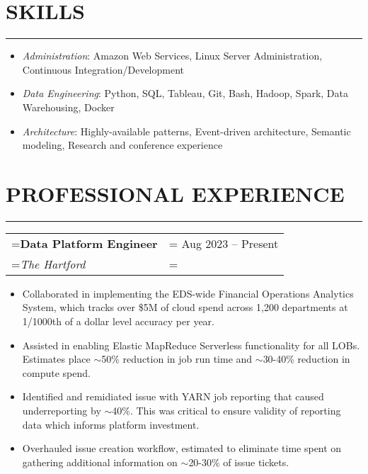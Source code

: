 \documentclass{article}
\begin{document}
\section*{\normalsize{SKILLS}}
\vspace{-1.8em}
\noindent\rule{\textwidth}{.5pt}
\begin{itemize}[label={}, leftmargin=1em]
    \setlength\itemsep{0em}
    \item \textit{Administration}: Amazon Web Services, Linux Server Administration, Continuous Integration/Development
    \item \textit{Data Engineering}: Python, SQL, Tableau, Git, Bash, Hadoop, Spark, Data Warehousing, Docker
    \item \textit{Architecture}: Highly-available patterns, Event-driven architecture, Semantic modeling, Research and conference experience 
\end{itemize}


\section*{\normalsize{PROFESSIONAL EXPERIENCE}}
\vspace{-1.8em}
\noindent\rule{\textwidth}{.5pt}

\vspace{.5em}
\hspace{-1em}
\begin{tabularx}{\textwidth}{
    >{\raggedright\arraybackslash\hsize=1\hsize\linewidth=\hsize}X
    >{\raggedleft\arraybackslash\hsize=1\hsize\linewidth=\hsize}X }
    \textbf{Data Platform Engineer} & Aug 2023 -- Present\\
    \textit{The Hartford} & \\
\end{tabularx}
\vspace{-.5em}
\begin{itemize}[label={--}, leftmargin=1em]
    \setlength\itemsep{0em}
    \item Collaborated in implementing the EDS-wide Financial Operations Analytics System, which tracks over \$5M of cloud spend across 1,200 departments at 1/1000th of a dollar level accuracy per year.
    \item Assisted in enabling Elastic MapReduce Serverless functionality for all LOBs. Estimates place $\sim$50\% reduction in job run time and $\sim$30-40\% reduction in compute spend.
    \item Identified and remidiated issue with YARN job reporting that caused underreporting by $\sim$40\%. This was critical to ensure validity of reporting data which informs platform investment.
    \item Overhauled issue creation workflow, estimated to eliminate time spent on gathering additional information on $\sim$20-30\% of issue tickets. 
\end{itemize}
\end{document}
